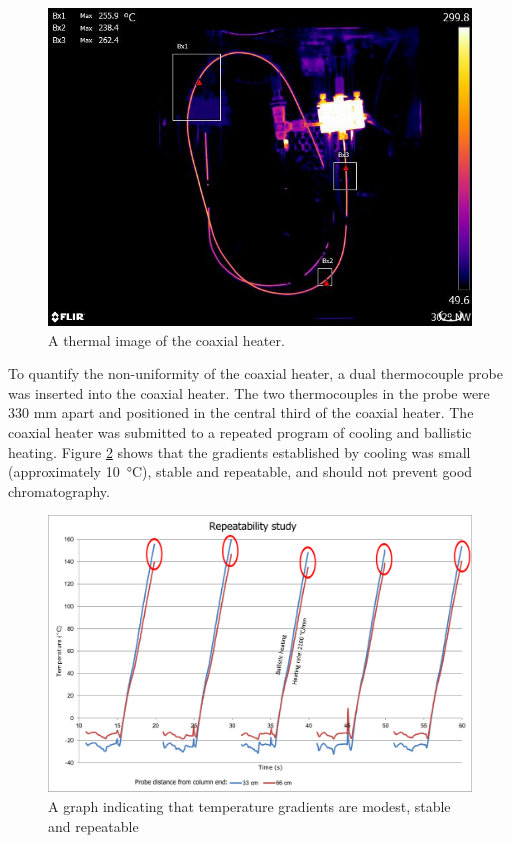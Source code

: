 \documentclass[aip,rsi,preprint,graphicx]{revtex4-1} %
\begin{document}
\begin{figure}
\includegraphics[width=\textwidth]{./Figures/1-16.jpg}%
\caption{\label{fig:ThermImg}A thermal image of the coaxial heater.}%
\end{figure}

To quantify the non-uniformity of the coaxial heater, a dual thermocouple probe
was inserted into the coaxial heater. The two thermocouples in the probe were
330 mm apart and positioned in the central third of the coaxial heater. The
coaxial heater was submitted to a repeated program of cooling and ballistic
heating. Figure \ref{fig:Repeatability} shows that the gradients established by
cooling was small (approximately \SI{10}{\celsius}), stable and repeatable, and
should not prevent good chromatography.

\begin{figure}
	\includegraphics[width=\textwidth]{./Figures/cp.pdf}%
	\caption{\label{fig:Repeatability}A graph indicating that temperature gradients are modest, stable and repeatable}%
\end{figure}
\end{document}
